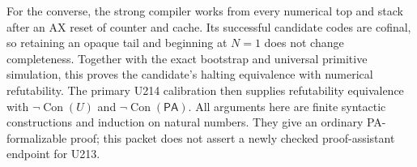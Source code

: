 For the converse, the strong compiler works from every numerical
top and stack after an AX reset of counter and cache.  Its successful
candidate codes are cofinal, so retaining an opaque tail and beginning
at $N=1$ does not change completeness.  Together with the exact
bootstrap and universal primitive simulation, this proves the
candidate's halting equivalence with numerical refutability.  The
primary U214 calibration then supplies refutability equivalence with
$\neg\operatorname{Con}(U)$ and $\neg\operatorname{Con}(\mathsf{PA})$.
All arguments here are finite syntactic constructions and induction on
natural numbers.  They give an ordinary PA-formalizable proof; this
packet does not assert a newly checked proof-assistant endpoint for U213.
